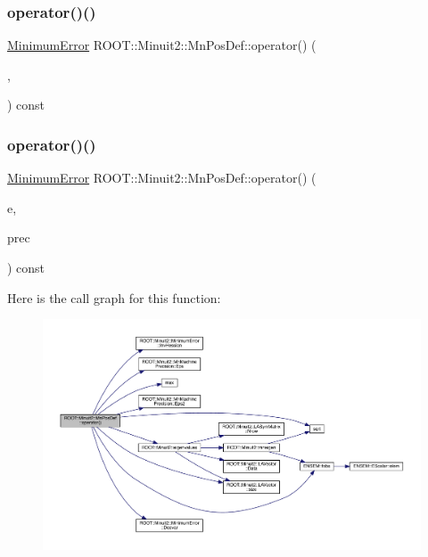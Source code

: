 \subsubsection{\texorpdfstring{operator()()}{operator()()}\hspace{0.1cm}{\footnotesize\ttfamily [3/4]}}
{\footnotesize\ttfamily \mbox{\hyperlink{classROOT_1_1Minuit2_1_1MinimumError}{Minimum\+Error}} R\+O\+O\+T\+::\+Minuit2\+::\+Mn\+Pos\+Def\+::operator() (\begin{DoxyParamCaption}\item[{const \mbox{\hyperlink{classROOT_1_1Minuit2_1_1MinimumError}{Minimum\+Error}} \&}]{,  }\item[{const \mbox{\hyperlink{classROOT_1_1Minuit2_1_1MnMachinePrecision}{Mn\+Machine\+Precision}} \&}]{ }\end{DoxyParamCaption}) const}

\mbox{\label{classROOT_1_1Minuit2_1_1MnPosDef_ace62b61f17edf0c57ef824003b99b9ec}} 
\subsubsection{\texorpdfstring{operator()()}{operator()()}\hspace{0.1cm}{\footnotesize\ttfamily [4/4]}}
{\footnotesize\ttfamily \mbox{\hyperlink{classROOT_1_1Minuit2_1_1MinimumError}{Minimum\+Error}} R\+O\+O\+T\+::\+Minuit2\+::\+Mn\+Pos\+Def\+::operator() (\begin{DoxyParamCaption}\item[{const \mbox{\hyperlink{classROOT_1_1Minuit2_1_1MinimumError}{Minimum\+Error}} \&}]{e,  }\item[{const \mbox{\hyperlink{classROOT_1_1Minuit2_1_1MnMachinePrecision}{Mn\+Machine\+Precision}} \&}]{prec }\end{DoxyParamCaption}) const}

Here is the call graph for this function\+:\nopagebreak
\begin{figure}[H]
\begin{center}
\leavevmode
\includegraphics[width=350pt]{d0/dab/classROOT_1_1Minuit2_1_1MnPosDef_ace62b61f17edf0c57ef824003b99b9ec_cgraph}
\end{center}
\end{figure}


